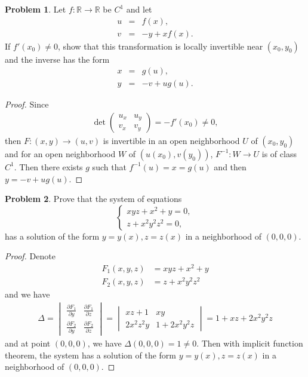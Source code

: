 \documentclass[11pt]{article}
\theoremstyle{definition}
\newtheorem{problem}{Problem}
\theoremstyle{definition}
\begin{document}
\begin{problem}
Let $f:\mathbb{R}\to\mathbb{R}$ be $C^1$ and let
\begin{eqnarray*}
u & = & f(x), \\
v & = & -y+xf(x).
\end{eqnarray*}
If $f'(x_0)\neq 0$, show that this transformation is locally
invertible near $(x_0,y_0)$ and the inverse has the form
\begin{eqnarray*}
x & = & g(u), \\
y & = & -v+ug(u).
\end{eqnarray*}
\end{problem}
\begin{proof}
Since 
\begin{align*}
    \det \begin{pmatrix}
        u_x & u_y \\
        v_x & v_y
    \end{pmatrix} = - f'(x_0) \neq 0,
\end{align*}
then $F: (x,y) \to (u,v)$ is invertible in an open neighborhood $U$ of $(x_0,y_0)$ and for an open neighborhood $W$ of $(u(x_0),v(y_0))$, $F^{-1}: W\to U$ is of class $C^1$. Then there exists $g$ such that $f^{-1}(u) = x = g(u)$ and then $y = -v + ug(u)$.
\end{proof}

\medskip

\begin{problem}
Prove that the system of equations
$$
\begin{cases}
xyz+x^2+y = 0,\\
z+x^2y^2z^2 = 0,
\end{cases}
$$
has a solution of the form $y=y(x), z=z(x)$ in a neighborhood of
$(0,0,0)$.
\end{problem}
\begin{proof}
Denote 
\begin{align*}
    F_1(x,y,z) & = xyz + x^2 + y \\
    F_2(x,y,z) & = z + x^2y^2z^2
\end{align*}
and we have
\begin{align*}
    \Delta = \begin{vmatrix}
        \frac{\partial F_1}{\partial y} & \frac{\partial F_1}{\partial z} \\
        \frac{\partial F_2}{\partial y} & \frac{\partial F_2}{\partial z}
    \end{vmatrix} = \begin{vmatrix}
        xz + 1 & xy \\
        2 x^2 z^2 y & 1 + 2 x^2 y^2 z
    \end{vmatrix} = 1 + xz + 2 x^2 y^2 z
\end{align*}
and at point $(0,0,0)$, we have $\Delta(0,0,0) = 1 \neq 0$. Then with implicit function theorem, the system has a solution of the form $y=y(x), z=z(x)$ in a neighborhood of
$(0,0,0)$.
\end{proof}
\end{document}
